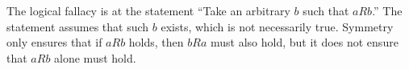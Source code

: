 \documentclass[answers]{exam}
\begin{document}
\begin{questions}
\begin{parts}
\begin{solution}
            The logical fallacy is at the statement ``Take an arbitrary $b$ such that $aRb$.''
            The statement assumes that such $b$ exists, which is not necessarily true.
            Symmetry only ensures that if $aRb$ holds, then $bRa$ must also hold, but it does not
            ensure that $aRb$ alone must hold.
        \end{solution}

    \end{parts}

\end{questions}
\end{document}
